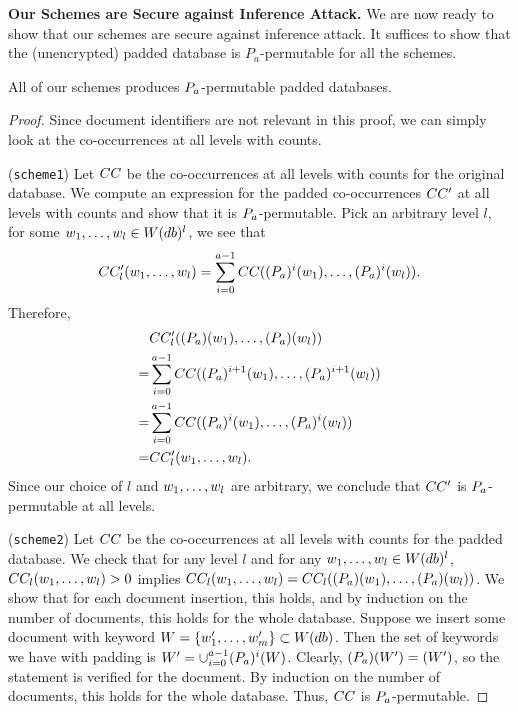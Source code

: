 \textbf{Our Schemes are Secure against Inference Attack.} We are now ready to show that our schemes are secure against inference attack. It suffices to show that the (unencrypted) padded database is $P_a$-permutable for all the schemes.

\begin{theorem}
All of our schemes produces $P_a$-permutable padded databases.
\end{theorem} 

\begin{proof}
Since document identifiers are not relevant in this proof, we can simply look at the co-occurrences at all levels with counts.

(\texttt{scheme1}) Let $CC$ be the co-occurrences at all levels with counts for the original database. We compute an expression for the padded co-occurrences $CC'$ at all levels with counts and show that it is $P_a$-permutable. Pick an arbitrary level $l$, for some $w_1, \dots, w_l \in W(db)^l$, we see that
\begin{equation*}
CC'_l(w_1, \dots, w_l) = \sum_{i = 0}^{a-1} CC((P_a)^i(w_1), \dots, (P_a)^i(w_l)).
\end{equation*}
Therefore,
\begin{align*}
  &CC'_l((P_a)(w_1), \dots, (P_a)(w_l))\\
= &\sum_{i = 0}^{a-1} CC((P_a)^{i+1}(w_1), \dots, (P_a)^{i+1}(w_l))\\
= &\sum_{i = 0}^{a-1} CC((P_a)^i(w_1), \dots, (P_a)^i(w_l))\\
= &CC'_l(w_1, \dots, w_l).
\end{align*}
Since our choice of $l$ and $w_1, \dots, w_l$ are arbitrary, we conclude that $CC'$ is $P_a$-permutable at all levels.


(\texttt{scheme2}) Let $CC$ be the co-occurrences at all levels with counts for the padded database. We check that for any level $l$ and for any $w_1, \dots, w_l \in W(db)^l$, $CC_l(w_1, \dots, w_l) > 0$ implies $CC_l(w_1, \dots, w_l) = CC_l((P_a)(w_1), \dots, (P_a)(w_l))$. We show that for each document insertion, this holds, and by induction on the number of documents, this holds for the whole database. Suppose we insert some document with keyword $W = \{w'_1, \dots, w'_m\} \subset W(db)$. Then the set of keywords we have with padding is $W' = \cup_{i=0}^{a-1} (P_a)^{i}(W)$. Clearly, $(P_a)(W') = (W')$, so the statement is verified for the document. By induction on the number of documents, this holds for the whole database. Thus, $CC$ is $P_a$-permutable.



\end{proof}
